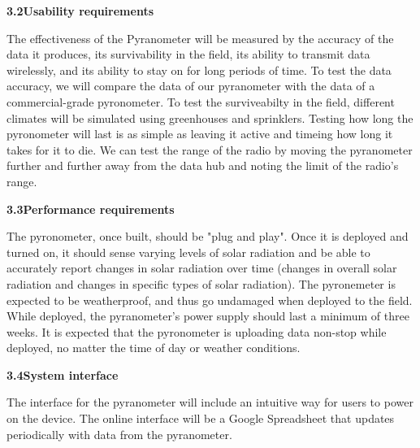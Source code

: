 \documentclass[10pt,draftclsnofoot,onecolumn,letterpaper]{article}
\begin{document}
{\fontsize{10pt}{12.0pt} \textbf{3.2\quad Usability requirements}\\\selectfont 
\par}\par
{\fontsize{10pt}{12.0pt} The effectiveness of the Pyranometer will be measured by the accuracy of the data it produces, its survivability in the field, its ability to transmit data wirelessly, and its ability to stay on for long periods of time. To test the data accuracy, we will compare the data of our pyranometer with the data of a commercial-grade pyronometer. To test the surviveabilty in the field, different climates will be simulated using greenhouses and sprinklers. Testing how long the pyronometer will last is as simple as leaving it active and timeing how long it takes for it to die. We can test the range of the radio by moving the pyranometer further and further away from the data hub and noting the limit of the radio's range.\\\selectfont 
\par}\par

{\fontsize{10pt}{12.0pt} \textbf{3.3\quad Performance requirements}\\\selectfont 
\par}\par
{\fontsize{10pt}{12.0pt} The pyronometer, once built, should be "plug and play". Once it is deployed and turned on, it should sense varying levels of solar radiation and be able to accurately report changes in solar radiation over time (changes in overall solar radiation and changes in specific types of solar radiation). The pyronemeter is expected to be weatherproof, and thus go undamaged when deployed to the field. While deployed, the pyranometer's power supply should last a minimum of three weeks. It is expected that the pyronometer is uploading data non-stop while deployed, no matter the time of day or weather conditions. \\\selectfont 
\par}\par

\pagebreak

{\fontsize{10pt}{12.0pt} \textbf{3.4\quad System interface}\\\selectfont 
\par}\par
{\fontsize{10pt}{12.0pt}
The interface for the pyranometer will include an intuitive way for users to power on the device. The online interface will be a Google Spreadsheet that updates periodically with data from the pyranometer.
\\\selectfont 
\par}\par
\end{document}
